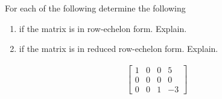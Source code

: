 For each of the following determine the following

\begin{enumerate}
\item if the matrix is in row-echelon form. Explain.
\item if the matrix is in reduced row-echelon form. Explain.
\end{enumerate}

\begin{align*}
	\left[
	\begin{array}{ccc|c}
	1 & 0 & 0 & 5 \\
	0 & 0 & 0 & 0 \\
	0 & 0 & 1 & -3
	\end{array}
	\right]
	\end{align*}